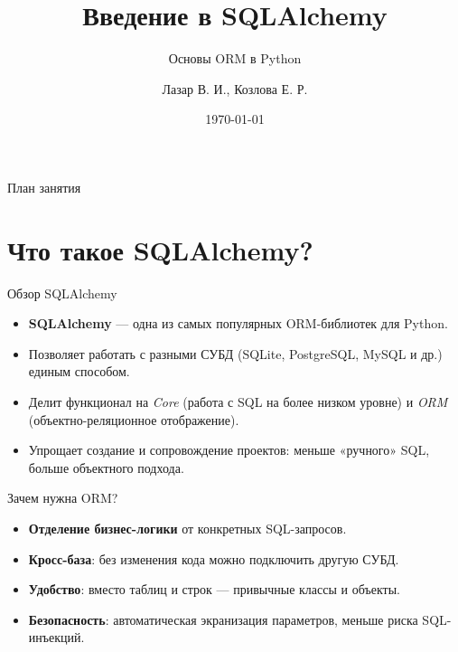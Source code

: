 \documentclass{beamer}
\title{Введение в SQLAlchemy}
\subtitle{Основы ORM в Python}
\author{Лазар В. И., Козлова Е. Р.}
\date{\today}
\begin{document}
\begin{frame}
	\titlepage
\end{frame}

\begin{frame}{План занятия}
	\tableofcontents
\end{frame}

\section{Что такое SQLAlchemy?}

\begin{frame}{Обзор SQLAlchemy}
	\begin{itemize}
		\item \textbf{SQLAlchemy} — одна из самых популярных ORM-библиотек для Python.
		\item Позволяет работать с разными СУБД (SQLite, PostgreSQL, MySQL и др.) единым способом.
		\item Делит функционал на \textit{Core} (работа с SQL на более низком уровне) и \textit{ORM} (объектно-реляционное отображение).
		\item Упрощает создание и сопровождение проектов: меньше «ручного» SQL, больше объектного подхода.
	\end{itemize}
\end{frame}

\begin{frame}{Зачем нужна ORM?}
	\begin{itemize}
		\item \textbf{Отделение бизнес-логики} от конкретных SQL-запросов.
		\item \textbf{Кросс-база}: без изменения кода можно подключить другую СУБД.
		\item \textbf{Удобство}: вместо таблиц и строк — привычные классы и объекты.
		\item \textbf{Безопасность}: автоматическая экранизация параметров, меньше риска SQL-инъекций.
	\end{itemize}
\end{frame}

\end{document}
